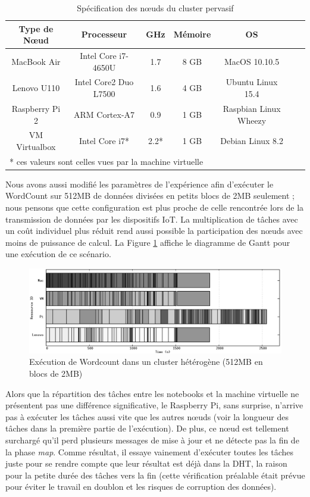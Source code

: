 \begin{table}
	\begin{center}
		\begin{tabular}{|c|c|c|c|c|c|c|}
			\hline
			Type de N{\oe}ud & Processeur & GHz &  Mémoire & OS\\
			\hline
			\hline
			MacBook Air & Intel Core i7-4650U & 1.7   & 8 GB & MacOS 10.10.5 \\
			Lenovo U110 & Intel Core2 Duo L7500 & 1.6   & 4 GB & Ubuntu Linux 15.4 \\
			Raspberry Pi 2 & ARM Cortex-A7 & 0.9  & 1 GB & Raspbian Linux Wheezy\\
			VM Virtualbox & Intel Core i7* & 2.2*  &  1 GB & Debian Linux 8.2 \\
			\hline
			\multicolumn{5}{l}{* ces valeurs sont celles vues par la machine virtuelle}
		\end{tabular}
	\end{center}
	\caption{\label{Table:laptops}Spécification des n{\oe}uds du cluster pervasif}
\end{table} 

Nous avons aussi modifié les paramètres de l'expérience afin d'exécuter le WordCount sur 512MB de données divisées en petits blocs de 2MB seulement ; nous pensons que cette configuration est plus proche de celle rencontrée lors de la transmission de données par les dispositifs IoT. La multiplication de tâches avec un coût individuel plus réduit rend aussi possible la participation des n{\oe}uds avec moins de puissance de calcul.  La Figure \ref{fig:hetero} affiche le diagramme de Gantt pour une exécution de ce scénario. 

\begin{figure}
	\centering
		\includegraphics[width=1\linewidth]{img/hetero2}
		\caption{Exécution de Wordcount dans un cluster hétérogène (512MB en blocs de 2MB)}\label{fig:hetero}
\end{figure}

Alors que la répartition des tâches entre les notebooks et la machine virtuelle ne présentent pas une différence significative, le Raspberry Pi, sans surprise, n'arrive pas à exécuter les tâches aussi vite que les autres n{\oe}uds (voir la longueur des tâches dans la première partie de l'exécution). De plus, ce n{\oe}ud est tellement surchargé qu'il perd plusieurs messages de mise à jour et ne détecte pas la fin de la phase \textit{map}. Comme résultat, il essaye vainement d'exécuter toutes les tâches juste pour se rendre compte que leur résultat est déjà dans la DHT, la raison pour la petite durée des tâches vers la fin (cette vérification préalable était prévue pour éviter le travail en doublon et les risques de corruption des données). 

